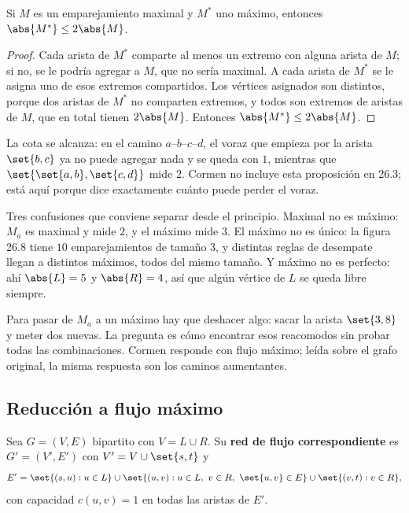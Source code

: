 \documentclass[11pt,letterpaper]{article}
\begin{document}
\begin{proposicion}
  \label{prop:emparejamiento-maximal}
  Si $M$ es un emparejamiento maximal y $M^*$ uno máximo, entonces
  $\abs{M^*} \le 2\abs{M}$.
\end{proposicion}

\begin{proof}
  Cada arista de $M^*$ comparte al menos un extremo con alguna arista
  de $M$; si no, se le podría agregar a $M$, que no sería maximal. A
  cada arista de $M^*$ se le asigna uno de esos extremos compartidos.
  Los vértices asignados son distintos, porque dos aristas de $M^*$
  no comparten extremos, y todos son extremos de aristas de $M$, que
  en total tienen $2\abs{M}$. Entonces $\abs{M^*} \le 2\abs{M}$.
\end{proof}

La cota se alcanza: en el camino $a$--$b$--$c$--$d$, el voraz que
empieza por la arista $\set{b, c}$ ya no puede agregar nada y se
queda con $1$, mientras que $\set{\set{a,b}, \set{c,d}}$ mide $2$.
Cormen no incluye esta proposición en 26.3; está aquí porque dice
exactamente cuánto puede perder el voraz.

\begin{ojo}
  Tres confusiones que conviene separar desde el principio. Maximal
  no es máximo: $M_a$ es maximal y mide $2$, y el máximo mide $3$. El
  máximo no es único: la figura 26.8 tiene $10$ emparejamientos de
  tamaño $3$, y distintas reglas de desempate llegan a distintos
  máximos, todos del mismo tamaño. Y máximo no es perfecto: ahí
  $\abs{L} = 5$ y $\abs{R} = 4$, así que algún vértice de $L$ se
  queda libre siempre.
\end{ojo}

Para pasar de $M_a$ a un máximo hay que deshacer algo: sacar la
arista $\set{3,8}$ y meter dos nuevas. La pregunta es cómo encontrar
esos reacomodos sin probar todas las combinaciones. Cormen responde
con flujo máximo; leída sobre el grafo original, la misma respuesta
son los caminos aumentantes.


\subsection*{Reducción a flujo máximo}

\begin{definicion}
  \label{def:red-emparejamiento}
  Sea $G = (V, E)$ bipartito con $V = L \cup R$. Su \textbf{red de
  flujo correspondiente} es $G' = (V', E')$ con
  $V' = V \cup \set{s, t}$ y
  \[
    E' = \set{(s, u) : u \in L}
         \cup \set{(u, v) : u \in L,\ v \in R,\ \set{u, v} \in E}
         \cup \set{(v, t) : v \in R} ,
  \]
  con capacidad $c(u, v) = 1$ en todas las aristas de $E'$.
\end{definicion}
\end{document}
